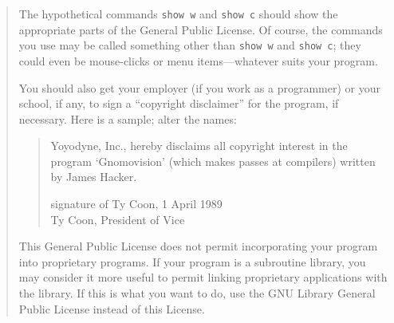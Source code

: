 \documentclass[twoside,11pt]{article}
\renewcommand{\_}{\texttt{\symbol{95}}}
\newcommand{\latexonlysmall}{\small}
\newcommand{\latexonlysmall}{}
\begin{document}
\begin{quote}
The hypothetical commands {\tt show w} and {\tt show c} should show the
appropriate parts of the General Public License.  Of course, the commands
you use may be called something other than {\tt show w} and {\tt show c};
they could even be mouse-clicks or menu items---whatever suits your
program.

You should also get your employer (if you work as a programmer) or your
school, if any, to sign a ``copyright disclaimer'' for the program, if
necessary.  Here is a sample; alter the names:

\begin{quote}
Yoyodyne, Inc., hereby disclaims all copyright interest in the program
`Gnomovision' (which makes passes at compilers) written by James Hacker.

signature of Ty Coon, 1 April 1989 \\
Ty Coon, President of Vice
\end{quote}


This General Public License does not permit incorporating your program
into proprietary programs.  If your program is a subroutine library, you
may consider it more useful to permit linking proprietary applications
with the library.  If this is what you want to do, use the GNU Library
General Public License instead of this License.
\end{quote}
%
%
%
%
\end{document}

